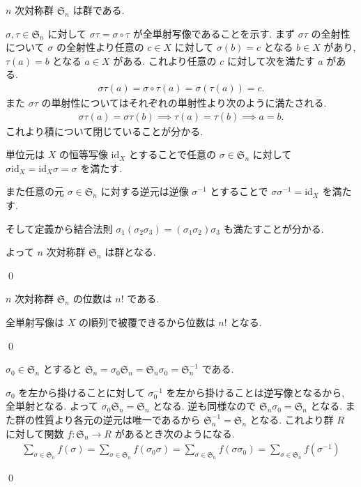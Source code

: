 \documentclass[uplatex,dvipdfmx,a4paper,11pt]{jlreq}
\makeatletter
\renewcommand{\SS}{\mathfrak{S}}
\newcommand{\id}{\mathrm{id}}
\numberwithin{equation}{section}
\theoremstyle{definition}
\renewenvironment{proof}[1][\proofname]{\par
  \normalfont
  \topsep6\p@\@plus6\p@ \trivlist
  \item[\hskip\labelsep{\bfseries #1}\@addpunct{\bfseries}]\ignorespaces\quad\par
}{
  \qed\endtrivlist\@endpefalse
}
\renewcommand\proofname{証明}
\makeatother
\begin{document}
\begin{theorem}[Q21-3(i)(ii)(iii)(iv)]
  $n$ 次対称群 $\SS_n$ は群である.
\end{theorem}
\begin{proof}
  $\sigma,\tau\in\SS_n$ に対して $\sigma\tau = \sigma\circ\tau$ が全単射写像であることを示す.
  まず $\sigma\tau$ の全射性について $\sigma$ の全射性より任意の $c\in X$ に対して $\sigma(b) = c$ となる $b\in X$ があり, $\tau(a) = b$ となる $a\in X$ がある.
  これより任意の $c$ に対して次を満たす $a$ がある.
  \begin{align}
    \sigma\tau(a) = \sigma\circ\tau(a) = \sigma(\tau(a)) = c.
  \end{align}
  また $\sigma\tau$ の単射性についてはそれぞれの単射性より次のように満たされる.
  \begin{align}
    \sigma\tau(a) = \sigma\tau(b) \implies \tau(a) = \tau(b) \implies a = b.
  \end{align}
  これより積について閉じていることが分かる.

  単位元は $X$ の恒等写像 $\id_X$ とすることで任意の $\sigma\in\SS_n$ に対して $\sigma\id_X = \id_X\sigma = \sigma$ を満たす.

  また任意の元 $\sigma\in\SS_n$ に対する逆元は逆像 $\sigma^{-1}$ とすることで $\sigma\sigma^{-1} = \id_X$ を満たす.

  そして定義から結合法則 $\sigma_1(\sigma_2\sigma_3) = (\sigma_1\sigma_2)\sigma_3$ も満たすことが分かる.

  よって $n$ 次対称群 $\SS_n$ は群となる.
\end{proof}

\begin{proposition}[Q21-4]
  $n$ 次対称群 $\SS_n$ の位数は $n!$ である.
\end{proposition}
\begin{proof}
  全単射写像は $X$ の順列で被覆できるから位数は $n!$ となる.
\end{proof}

\begin{proposition}[Q21-5(i)(ii), Q21-6(i)(ii)]
  $\sigma_0\in\SS_n$ とすると $\SS_n = \sigma_0\SS_n = \SS_n\sigma_0 = \SS_n^{-1}$ である.
\end{proposition}
\begin{proof}
  $\sigma_0$ を左から掛けることに対して $\sigma_0^{-1}$ を左から掛けることは逆写像となるから, 全単射となる. よって $\sigma_0\SS_n = \SS_n$ となる. 逆も同様なので $\SS_n\sigma_0 = \SS_n$ となる.
  また群の性質より各元の逆元は唯一であるから $\SS_n^{-1} = \SS_n$ となる.
  これより群 $R$ に対して関数 $f:\SS_n\to R$ があるとき次のようになる.
  \begin{align}
    \sum_{\sigma\in\SS_n}f(\sigma) = \sum_{\sigma\in\SS_n}f(\sigma_0\sigma) = \sum_{\sigma\in\SS_n}f(\sigma\sigma_0) = \sum_{\sigma\in\SS_n}f(\sigma^{-1})
  \end{align}
\end{proof}
\end{document}
